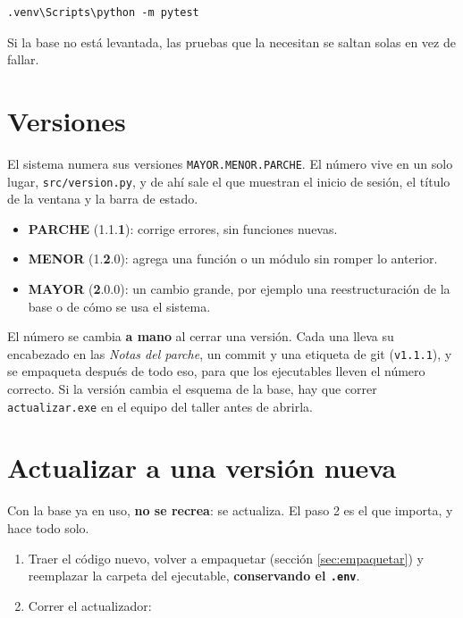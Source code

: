 \documentclass[11pt,a4paper]{article}
\begin{document}
\begin{lstlisting}
.venv\Scripts\python -m pytest
\end{lstlisting}

Si la base no está levantada, las pruebas que la necesitan se saltan solas en
vez de fallar.

\section{Versiones}

El sistema numera sus versiones \texttt{MAYOR.MENOR.PARCHE}. El número vive en un
solo lugar, \texttt{src/version.py}, y de ahí sale el que muestran el inicio de
sesión, el título de la ventana y la barra de estado.

\begin{itemize}
  \item \textbf{PARCHE} (1.1.\textbf{1}): corrige errores, sin funciones nuevas.
  \item \textbf{MENOR} (1.\textbf{2}.0): agrega una función o un módulo sin romper lo
        anterior.
  \item \textbf{MAYOR} (\textbf{2}.0.0): un cambio grande, por ejemplo una
        reestructuración de la base o de cómo se usa el sistema.
\end{itemize}

El número se cambia \textbf{a mano} al cerrar una versión. Cada una lleva su
encabezado en las \emph{Notas del parche}, un commit y una etiqueta de git
(\texttt{v1.1.1}), y se empaqueta después de todo eso, para que los ejecutables
lleven el número correcto. Si la versión cambia el esquema de la base, hay que
correr \texttt{actualizar.exe} en el equipo del taller antes de abrirla.

\section{Actualizar a una versión nueva}

Con la base ya en uso, \textbf{no se recrea}: se actualiza. El paso 2 es el que
importa, y hace todo solo.

\begin{enumerate}
  \item Traer el código nuevo, volver a empaquetar (sección
        \ref{sec:empaquetar}) y reemplazar la carpeta del ejecutable,
        \textbf{conservando el \texttt{.env}}.
  \item Correr el actualizador:
\end{enumerate}
\end{document}
